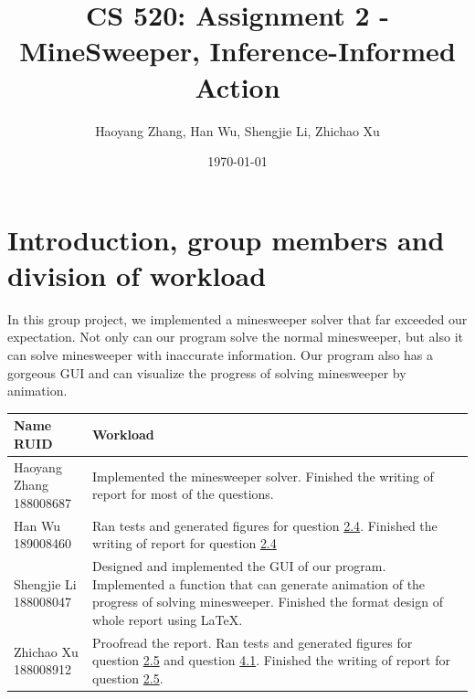 \documentclass[letter]{article}
\title{CS 520: Assignment 2 - MineSweeper, Inference-Informed Action}
\author{Haoyang Zhang, Han Wu, Shengjie Li, Zhichao Xu}
\date{\today}
\begin{document}
\maketitle

\section{Introduction, group members and division of workload}
\label{sec:Introduction}

In this group project, we implemented a minesweeper solver that far exceeded our expectation. Not only can our program solve the normal minesweeper, but also it can solve minesweeper with inaccurate information. Our program also has a gorgeous GUI and can visualize the progress of solving minesweeper by animation. \\
\begin{tabular}{| p{2.5cm} | p{\textwidth -3.5cm} |}
	\hline
	\makecell[c]{Name \\ RUID} & Workload \\
	\hline
	\makecell[c]{Haoyang Zhang \\ 188008687} & {Implemented the minesweeper solver. Finished the writing of report for most of the questions.} \\
	\hline
	\makecell[c]{Han Wu \\ 189008460} & {Ran tests and generated figures for question \hyperref[han]{2.4}. Finished the writing of report for question \hyperref[han]{2.4}} \\
	\hline
	\makecell[c]{Shengjie Li \\ 188008047} & {Designed and implemented the GUI of our program. Implemented a function that can generate animation of the progress of solving minesweeper. Finished the format design of whole report using \LaTeX. } \\
	\hline
	\makecell[c]{Zhichao Xu \\ 188008912} & {Proofread the report. Ran tests and generated figures for question \hyperref[zhichao1]{2.5} and question \hyperref[zhichao2]{4.1}. Finished the writing of report for question \hyperref[zhichao1]{2.5}.} \\
	\hline
\end{tabular}
\end{document}
